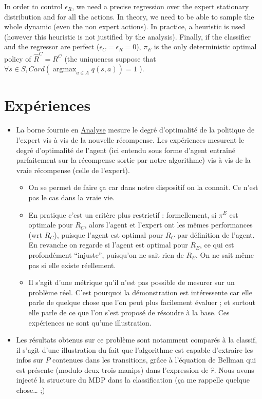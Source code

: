 \documentclass[11pt]{article}
\newcommand{\argmax}{\operatorname*{argmax}} %
\begin{document}
In order to control $\epsilon_R$, we need a precise regression over the expert stationary distribution and for all the actions. In theory, we need to be able to sample the whole dynamic (even the non expert actions). In practice, a heuristic is used (however this heuristic is not justified by the analysis).
Finally, if the classifier and the regressor are perfect ($\epsilon_C=\epsilon_R=0$), $\pi_E$ is the only deterministic optimal policy of $\hat{R}^C=R^C$ (the uniqueness suppose that $\forall s\in S, Card(\argmax_{a\in A}q(s,a))=1$ ).


\section{Expériences}
\label{sec-6}

\begin{itemize}
\item La borne fournie en \hyperref[sec-5]{Analyse} mesure le degré d'optimalité de la politique de l'expert vis à vis de la nouvelle récompense. Les expériences mesurent le degré d'optimalité de l'agent (ici entendu sous forme d'agent entraîné parfaitement sur la récompense sortie par notre algorithme) vis à vis de la vraie récompense (celle de l'expert).
\begin{itemize}
\item On se permet de faire ça car dans notre dispositif on la connait. Ce n'est pas le cas dans la vraie vie.
\item En pratique c'est un critère plus restrictif : formellement, si $\pi^E$ est optimale pour $R_C$, alors l'agent et l'expert ont les mêmes performances (wrt $R_C$), puisque l'agent est optimal pour $R_C$ par définition de l'agent. En revanche on regarde si l'agent est optimal pour $R_E$, ce qui est profondément ``injuste'', puisqu'on ne sait rien de $R_E$. On ne sait même pas si elle existe réellement.
\item Il s'agit d'une métrique qu'il n'est pas possible de mesurer sur un problème réel. C'est pourquoi la démonstration est intéressente car elle parle de quelque chose que l'on peut plus facilement évaluer ; et surtout elle parle de ce que l'on s'est proposé de résoudre à la base. Ces expériences ne sont qu'une illustration.
\end{itemize}
\item Les résultats obtenus sur ce problème sont notamment comparés à la classif, il s'agit d'une illustration du fait que l'algorithme est capable d'extraire les infos sur $P$ contenues dans les transitions, grâce à l'équation de Bellman qui est présente (modulo deux trois manips) dans l'expression de $\hat r$. Nous avons injecté la structure du MDP dans la classification (ça me rappelle quelque chose\ldots{} ;)

\end{itemize}
\end{document}
